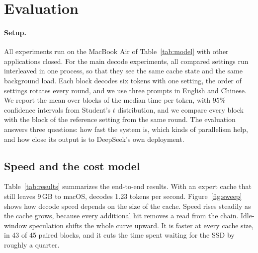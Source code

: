 \section{Evaluation}
\label{sec:eval}
\paragraph{Setup.} All experiments run on the MacBook Air of Table~\ref{tab:model} with other applications closed. For the main decode experiments, all compared settings run interleaved in one process, so that they see the same cache state and the same background load. Each block decodes six tokens with one setting, the order of settings rotates every round, and we use three prompts in English and Chinese. We report the mean over blocks of the median time per token, with 95\% confidence intervals from Student's $t$ distribution, and we compare every block with the block of the reference setting from the same round. The evaluation answers three questions: how fast the system is, which kinds of parallelism help, and how close its output is to DeepSeek's own deployment.

\subsection{Speed and the cost model}
\label{sec:e2e}
Table~\ref{tab:results} summarizes the end-to-end results. With an expert cache that still leaves 9\,GB to macOS, \method{} decodes 1.23 tokens per second. Figure~\ref{fig:sweep} shows how decode speed depends on the size of the cache. Speed rises steadily as the cache grows, because every additional hit removes a read from the chain. Idle-window speculation shifts the whole curve upward. It is faster at every cache size, in 43 of 45 paired blocks, and it cuts the time spent waiting for the SSD by roughly a quarter.

